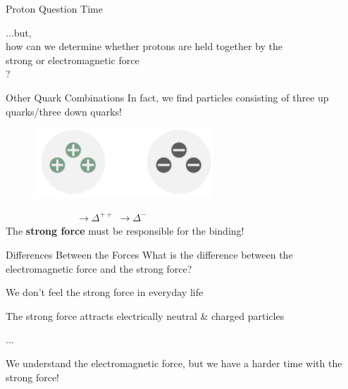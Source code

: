 \begin{frame}{Proton Question Time}
\begin{center} \Large
        ...but, \\ how can we determine whether protons are held together by the\\ strong or electromagnetic force\\?
\end{center}

\end{frame}
\begin{frame}{Other Quark Combinations}
In fact, we find particles consisting of three up quarks/three down quarks!
    \begin{figure}[htb]
        \includegraphics[width=0.6\textwidth]{Figures Introductory Lecture/Standard Model/DeltaBaryons.png}
        \label{fig:strong_force_2}
    \end{figure}\pause
    $\hspace{3cm}\rightarrow \Delta^{++}$\hspace{3cm} $\rightarrow \Delta^{-}$\\ \vspace{0.5cm}
     The \textbf{strong force} must be responsible for the binding!
\end{frame}
\begin{frame}{Differences Between the Forces}
What is the difference between the electromagnetic force and the strong force?
\pause
\begin{itemise}
    \item We don't feel the strong force in everyday life
    \item The strong force attracts electrically neutral \& charged particles
    \item ... \pause
    \item[\ding{43}] We understand the electromagnetic force, but we have a harder time with the strong force!
\end{itemise}
\end{frame}
